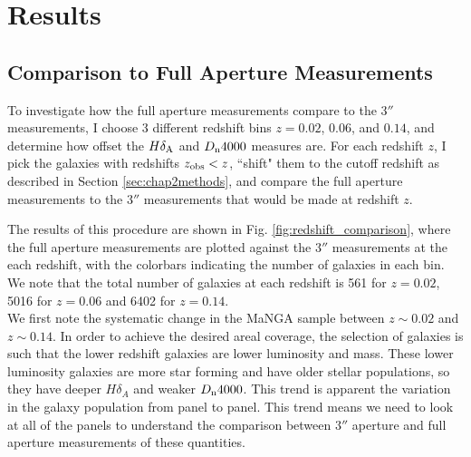 \section{Results}
\subsection{Comparison to Full Aperture Measurements}

To investigate how the full aperture measurements compare to the 3$''$ 
measurements, I choose 3 different redshift bins $z = 0.02$, $0.06$, 
and $0.14$, and determine how offset the $H\delta_{\rm A}$ and 
$D_{\rm n}4000$ measures are. For each redshift $z$, I pick the galaxies 
with redshifts $z_{\rm obs} < z$, ``shift" them to the cutoff 
redshift as described in Section \ref{sec:chap2methods}, 
and compare the full aperture measurements to the 3$''$
measurements that would be made at redshift $z$. 

The results of this procedure are shown in 
Fig. \ref{fig:redshift_comparison}, where the full 
aperture measurements are plotted against the 3$''$ measurements at 
the each redshift, with the colorbars indicating the number of galaxies 
in each bin. We note that the total number of galaxies at each redshift 
is 561 for $z = 0.02$, 5016 for $z = 0.06$ and 6402 for $z = 0.14$.\\

We first note the systematic change in the MaNGA sample between $z\sim 0.02$
and $z\sim 0.14$. In order to achieve the desired areal coverage, the selection
of galaxies is such that the lower redshift galaxies are lower luminosity
and mass. These lower luminosity galaxies are more star forming and have
older stellar populations, so they have deeper $H\delta_{A}$ and weaker 
$D_{\rm n} 4000$. This trend is apparent the variation in the galaxy
population from panel to panel. This trend means we need to look at all
of the panels to understand the comparison between $3''$ aperture and full
aperture measurements of these quantities.

